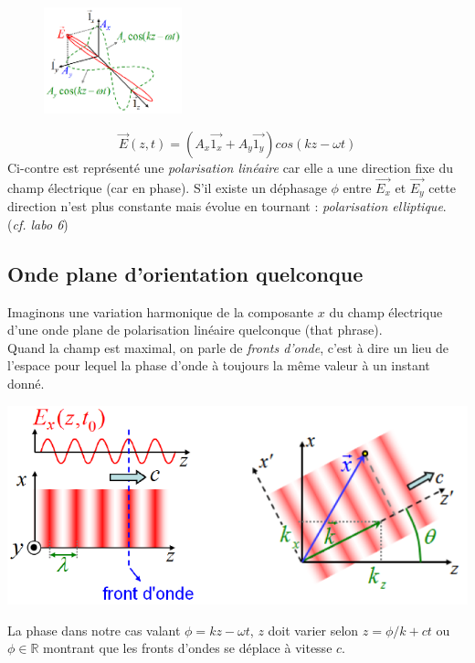 \documentclass	[11pt, a4paper, openany]{book}
\begin{document}
\begin{figure}
\includegraphics[width=4cm]{oo/image34.png}
\end{figure}
\begin{equation}
\vec{E}(z,t) = (A_x\vec{1_x} + A_y \vec{1_y})cos(kz - \omega t)
\end{equation}
Ci-contre est représenté une \textit{polarisation linéaire} car elle a une direction fixe du champ électrique (car en phase). S'il existe un déphasage $\phi$ entre $\vec{E_x}$ et $\vec{E_y}$ cette direction n'est plus constante mais évolue en tournant : \textit{polarisation elliptique}. (\textit{cf. labo 6})

\subsection{Onde plane d'orientation quelconque}
Imaginons une variation harmonique de la composante $x$ du champ électrique d'une onde plane de polarisation linéaire quelconque (that phrase).\\
Quand la champ est maximal, on parle de \textit{fronts d'onde}, c'est à dire un lieu de l'espace pour lequel la phase d'onde à toujours la même valeur à un instant donné.
\begin{center}
\includegraphics[scale=0.4]{oo/image35.png}
\end{center}
La phase dans notre cas valant $\phi = kz - \omega t$, $z$ doit varier selon $z = \phi / k + ct$ ou $\phi \in \mathbb{R}$ montrant que les fronts d'ondes se déplace à vitesse $c$.\\
\end{document}

